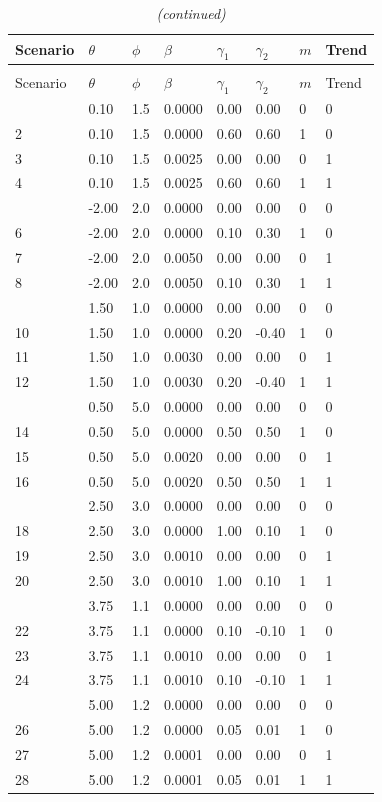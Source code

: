 \documentclass[preprint, 3p, authoryear]{elsarticle} %
\begin{document}
\begin{longtable}[t]{llllllll}
\caption{\label{tab:scenariosTbl}Parameters and criteria utilized to generate the 28 scenarios.}\\
\toprule
Scenario & $\theta$ & $\phi$ & $\beta$ & $\gamma_1$ & $\gamma_2$ & $m$ & Trend\\
\midrule
\endfirsthead
\caption[]{\textit{(continued)}}\\
\toprule
Scenario & $\theta$ & $\phi$ & $\beta$ & $\gamma_1$ & $\gamma_2$ & $m$ & Trend\\
\midrule
\endhead

\endfoot
\bottomrule
\endlastfoot
1 & 0.10 & 1.5 & 0.0000 & 0.00 & 0.00 & 0 & 0\\
2 & 0.10 & 1.5 & 0.0000 & 0.60 & 0.60 & 1 & 0\\
3 & 0.10 & 1.5 & 0.0025 & 0.00 & 0.00 & 0 & 1\\
4 & 0.10 & 1.5 & 0.0025 & 0.60 & 0.60 & 1 & 1\\
\addlinespace
5 & -2.00 & 2.0 & 0.0000 & 0.00 & 0.00 & 0 & 0\\
6 & -2.00 & 2.0 & 0.0000 & 0.10 & 0.30 & 1 & 0\\
7 & -2.00 & 2.0 & 0.0050 & 0.00 & 0.00 & 0 & 1\\
8 & -2.00 & 2.0 & 0.0050 & 0.10 & 0.30 & 1 & 1\\
\addlinespace
9 & 1.50 & 1.0 & 0.0000 & 0.00 & 0.00 & 0 & 0\\
10 & 1.50 & 1.0 & 0.0000 & 0.20 & -0.40 & 1 & 0\\
11 & 1.50 & 1.0 & 0.0030 & 0.00 & 0.00 & 0 & 1\\
12 & 1.50 & 1.0 & 0.0030 & 0.20 & -0.40 & 1 & 1\\
\addlinespace
13 & 0.50 & 5.0 & 0.0000 & 0.00 & 0.00 & 0 & 0\\
14 & 0.50 & 5.0 & 0.0000 & 0.50 & 0.50 & 1 & 0\\
15 & 0.50 & 5.0 & 0.0020 & 0.00 & 0.00 & 0 & 1\\
16 & 0.50 & 5.0 & 0.0020 & 0.50 & 0.50 & 1 & 1\\
\addlinespace
17 & 2.50 & 3.0 & 0.0000 & 0.00 & 0.00 & 0 & 0\\
18 & 2.50 & 3.0 & 0.0000 & 1.00 & 0.10 & 1 & 0\\
19 & 2.50 & 3.0 & 0.0010 & 0.00 & 0.00 & 0 & 1\\
20 & 2.50 & 3.0 & 0.0010 & 1.00 & 0.10 & 1 & 1\\
\addlinespace
21 & 3.75 & 1.1 & 0.0000 & 0.00 & 0.00 & 0 & 0\\
22 & 3.75 & 1.1 & 0.0000 & 0.10 & -0.10 & 1 & 0\\
23 & 3.75 & 1.1 & 0.0010 & 0.00 & 0.00 & 0 & 1\\
24 & 3.75 & 1.1 & 0.0010 & 0.10 & -0.10 & 1 & 1\\
\addlinespace
25 & 5.00 & 1.2 & 0.0000 & 0.00 & 0.00 & 0 & 0\\
26 & 5.00 & 1.2 & 0.0000 & 0.05 & 0.01 & 1 & 0\\
27 & 5.00 & 1.2 & 0.0001 & 0.00 & 0.00 & 0 & 1\\
28 & 5.00 & 1.2 & 0.0001 & 0.05 & 0.01 & 1 & 1\\*
\end{longtable}
\end{document}
